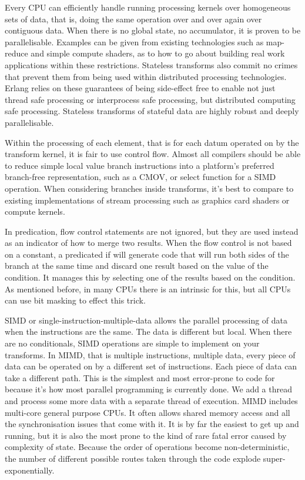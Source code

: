 \documentclass[a4paper,12pt]{book}
\begin{document}
Every CPU can efficiently handle running processing kernels over homogeneous sets of data, that is, doing the same operation over and over again over contiguous data.
When there is no global state, no accumulator, it is proven to be parallelisable.
Examples can be given from existing technologies such as map-reduce and simple compute shaders, as to how to go about building real work applications within these restrictions.
Stateless transforms also commit no crimes that prevent them from being used within distributed processing technologies.
Erlang relies on these guarantees of being side-effect free to enable not just thread safe processing or interprocess safe processing, but distributed computing safe processing.
Stateless transforms of stateful data are highly robust and deeply parallelisable.

Within the processing of each element, that is for each datum operated on by the transform kernel, it is fair to use control flow.
Almost all compilers should be able to reduce simple local value branch instructions into a platform's preferred branch-free representation, such as a CMOV, or select function for a SIMD operation.
When considering branches inside transforms, it's best to compare to existing implementations of stream processing such as graphics card shaders or compute kernels.

In predication, flow control statements are not ignored, but they are used instead as an indicator of how to merge two results.
When the flow control is not based on a constant, a predicated if will generate code that will run both sides of the branch at the same time and discard one result based on the value of the condition.
It manages this by selecting one of the results based on the condition.
As mentioned before, in many CPUs there is an intrinsic for this, but all CPUs can use bit masking to effect this trick.

SIMD or single-instruction-multiple-data allows the parallel processing of data when the instructions are the same.
The data is different but local.
When there are no conditionals, SIMD operations are simple to implement on your transforms.
In MIMD, that is multiple instructions, multiple data, every piece of data can be operated on by a different set of instructions.
Each piece of data can take a different path.
This is the simplest and most error-prone to code for because it's how most parallel programming is currently done.
We add a thread and process some more data with a separate thread of execution.
MIMD includes multi-core general purpose CPUs.
It often allows shared memory access and all the synchronisation issues that come with it.
It is by far the easiest to get up and running, but it is also the most prone to the kind of rare fatal error caused by complexity of state.
Because the order of operations become non-deterministic, the number of different possible routes taken through the code explode super-exponentially.
\end{document}

